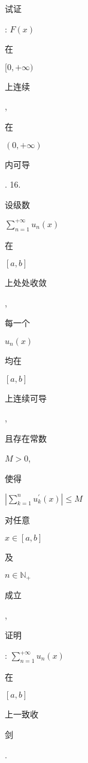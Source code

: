 \documentclass[10pt]{article}
\begin{document}
\begin{CJK}{UTF8}{mj}试证\end{CJK}: $F(x)$ \begin{CJK}{UTF8}{mj}在\end{CJK} $[0,+\infty)$ \begin{CJK}{UTF8}{mj}上连续\end{CJK}, \begin{CJK}{UTF8}{mj}在\end{CJK} $(0,+\infty)$ \begin{CJK}{UTF8}{mj}内可导\end{CJK}. 16. \begin{CJK}{UTF8}{mj}设级数\end{CJK} $\sum_{n=1}^{+\infty} u_{n}(x)$ \begin{CJK}{UTF8}{mj}在\end{CJK} $[a, b]$ \begin{CJK}{UTF8}{mj}上处处收敛\end{CJK},\begin{CJK}{UTF8}{mj}每一个\end{CJK} $u_{n}(x)$ \begin{CJK}{UTF8}{mj}均在\end{CJK} $[a, b]$ \begin{CJK}{UTF8}{mj}上连续可导\end{CJK}, \begin{CJK}{UTF8}{mj}且存在常数\end{CJK} $M>0$, \begin{CJK}{UTF8}{mj}使得\end{CJK} $\left|\sum_{k=1}^{n} u_{k}^{\prime}(x)\right| \leqslant M$ \begin{CJK}{UTF8}{mj}对任意\end{CJK} $x \in[a, b]$ \begin{CJK}{UTF8}{mj}及\end{CJK} $n \in \mathbb{N}_{+}$\begin{CJK}{UTF8}{mj}成立\end{CJK}, \begin{CJK}{UTF8}{mj}证明\end{CJK}: $\sum_{n=1}^{+\infty} u_{n}(x)$ \begin{CJK}{UTF8}{mj}在\end{CJK} $[a, b]$ \begin{CJK}{UTF8}{mj}上一致收\end{CJK} \begin{CJK}{UTF8}{mj}剑\end{CJK}.
\end{document}
